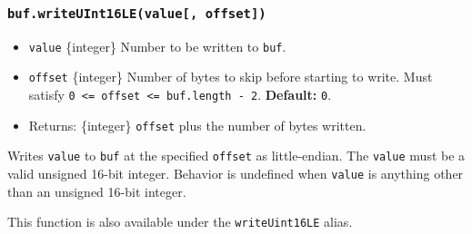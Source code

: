 \begin{Shaded}
\begin{Highlighting}[]
\NormalTok{ \{ }\NormalTok{ \} }\OperatorTok{=} \NormalTok{(}\NormalTok{)}\OperatorTok{;}

\OperatorTok{=} \NormalTok{(}\NormalTok{)}\OperatorTok{;}

\NormalTok{(}\OperatorTok{,} \NormalTok{)}\OperatorTok{;}
\NormalTok{(}\OperatorTok{,} \NormalTok{)}\OperatorTok{;}

\OperatorTok{;}
\end{Highlighting}
\end{Shaded}

\subsubsection{\texorpdfstring{\texttt{buf.writeUInt16LE(value{[},\ offset{]})}}{buf.writeUInt16LE(value{[}, offset{]})}}\label{buf.writeuint16levalue-offset}

\begin{itemize}
\tightlist
\item
  \texttt{value} \{integer\} Number to be written to \texttt{buf}.
\item
  \texttt{offset} \{integer\} Number of bytes to skip before starting to
  write. Must satisfy
  \texttt{0\ \textless{}=\ offset\ \textless{}=\ buf.length\ -\ 2}.
  \textbf{Default:} \texttt{0}.
\item
  Returns: \{integer\} \texttt{offset} plus the number of bytes written.
\end{itemize}

Writes \texttt{value} to \texttt{buf} at the specified \texttt{offset}
as little-endian. The \texttt{value} must be a valid unsigned 16-bit
integer. Behavior is undefined when \texttt{value} is anything other
than an unsigned 16-bit integer.

This function is also available under the \texttt{writeUint16LE} alias.

